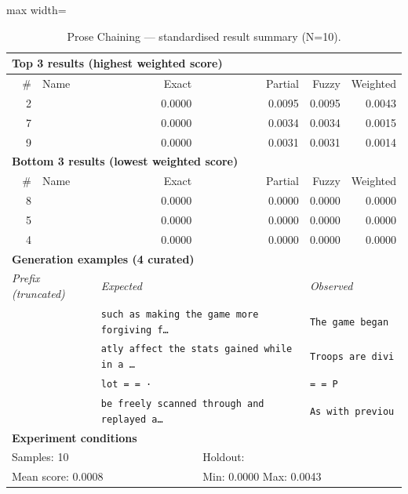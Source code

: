 \begin{table}[htbp]
\centering
\caption{Prose Chaining — standardised result summary (N=10).}
\label{tab:prose_chaining_summary}
\begin{adjustbox}{max width=\textwidth}
\begin{tabular}{r p{5cm} r r r r}
\toprule
\multicolumn{6}{l}{\textbf{Top 3 results (highest weighted score)}} \\
\midrule
\# & Name & Exact & Partial & Fuzzy & Weighted \\
\midrule
2 &  & 0.0000 & 0.0095 & 0.0095 & 0.0043 \\
7 &  & 0.0000 & 0.0034 & 0.0034 & 0.0015 \\
9 &  & 0.0000 & 0.0031 & 0.0031 & 0.0014 \\
\midrule
\multicolumn{6}{l}{\textbf{Bottom 3 results (lowest weighted score)}} \\
\midrule
\# & Name & Exact & Partial & Fuzzy & Weighted \\
\midrule
8 &  & 0.0000 & 0.0000 & 0.0000 & 0.0000 \\
5 &  & 0.0000 & 0.0000 & 0.0000 & 0.0000 \\
4 &  & 0.0000 & 0.0000 & 0.0000 & 0.0000 \\
\midrule
\multicolumn{6}{l}{\textbf{Generation examples (4 curated)}} \\
\midrule
\multicolumn{2}{l}{\textit{Prefix (truncated)}} & \multicolumn{2}{l}{\textit{Expected}} & \multicolumn{2}{l}{\textit{Observed}} \\
\midrule
\multicolumn{2}{l}{\texttt{}} & \multicolumn{2}{l}{\texttt{such as making the game more forgiving f\ldots}} & \multicolumn{2}{l}{\texttt{The game began}} \\
\multicolumn{2}{l}{\texttt{}} & \multicolumn{2}{l}{\texttt{atly affect the stats gained while in a \ldots}} & \multicolumn{2}{l}{\texttt{Troops are divi}} \\
\multicolumn{2}{l}{\texttt{}} & \multicolumn{2}{l}{\texttt{lot = = ·}} & \multicolumn{2}{l}{\texttt{= = P}} \\
\multicolumn{2}{l}{\texttt{}} & \multicolumn{2}{l}{\texttt{be freely scanned through and replayed a\ldots}} & \multicolumn{2}{l}{\texttt{As with previou}} \\
\midrule
\multicolumn{6}{l}{\textbf{Experiment conditions}} \\
\midrule
\multicolumn{3}{l}{Samples: 10} & \multicolumn{3}{l}{Holdout: } \\
\multicolumn{3}{l}{Mean score: 0.0008} & \multicolumn{3}{l}{Min: 0.0000 \quad Max: 0.0043} \\

\end{tabular}
\end{adjustbox}
\end{table}
